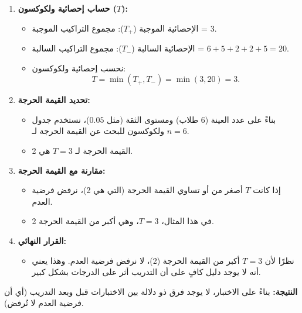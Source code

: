 \begin{enumerate}
	\item \textbf{حساب إحصائية ولكوكسون (\(T\)):}
	\begin{itemize}
		\item الإحصائية الموجبة (\(T_+\)): مجموع التراكيب الموجبة = \( 3 \).
		\item الإحصائية السالبة (\(T_-\)): مجموع التراكيب السالبة = \( 6 + 5 + 2 + 2 + 5 = 20 \).
		\item نحسب إحصائية ولكوكسون:
		\[
		T = \min(T_+, T_-) = \min(3, 20) = 3.
		\]
	\end{itemize}
	
	\item \textbf{تحديد القيمة الحرجة:}
	\begin{itemize}
		\item بناءً على عدد العينة (6 طلاب) ومستوى الثقة (مثل $0.05$)، نستخدم جدول ولكوكسون للبحث عن القيمة الحرجة لـ \( n = 6 \).
		\item القيمة الحرجة لـ \( T = 3 \) هي 2.
	\end{itemize}
	
	\item \textbf{مقارنة مع القيمة الحرجة:}
	\begin{itemize}
		\item إذا كانت \( T \) أصغر من أو تساوي القيمة الحرجة (التي هي 2)، نرفض فرضية العدم.
		\item في هذا المثال، \( T = 3 \)، وهي أكبر من القيمة الحرجة 2.
	\end{itemize}
	
	\item \textbf{القرار النهائي:}
	\begin{itemize}
		\item نظرًا لأن \( T = 3 \) أكبر من القيمة الحرجة (2)، لا نرفض فرضية العدم. وهذا يعني أنه لا يوجد دليل كافٍ على أن التدريب أثر على الدرجات بشكل كبير.
	\end{itemize}
\end{enumerate}

\textbf{النتيجة:} بناءً على الاختبار، لا يوجد فرق ذو دلالة بين الاختبارات قبل وبعد التدريب (أي أن فرضية العدم لا تُرفض).
	
